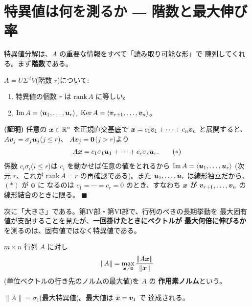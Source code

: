 \section{特異値は何を測るか ― 階数と最大伸び率}

特異値分解は、$A$ の重要な情報をすべて「読み取り可能な形」で
陳列してくれる。まず\textbf{階数}である。

\begin{teiri}[特異値分解から読み取れる部分空間]\label{thm:svd-rank}
$A = U\Sigma\,{}^tV$(階数 $r$)について:
\begin{enumerate}
\item 特異値の個数 $r$ は $\mathrm{rank}\,A$ に等しい。
\item $\mathrm{Im}\,A = \langle \bm{u}_1, \dots, \bm{u}_r \rangle$,
\quad $\mathrm{Ker}\,A = \langle \bm{v}_{r+1}, \dots, \bm{v}_n \rangle$。
\end{enumerate}
\end{teiri}

\noindent\textbf{(証明)}\quad
任意の $\bm{x} \in \mathbb{R}^n$ を正規直交基底で
$\bm{x} = c_1\bm{v}_1 + \cdots + c_n\bm{v}_n$ と展開すると、
$A\bm{v}_j = \sigma_j\bm{u}_j$($j \le r$)、
$A\bm{v}_j = \bm{0}$($j > r$)より
\[
A\bm{x} = c_1\sigma_1\bm{u}_1 + \cdots + c_r\sigma_r\bm{u}_r.
\tag{$*$}
\]
係数 $c_i\sigma_i$($i \le r$)は $c_i$ を動かせば任意の値をとれるから
$\mathrm{Im}\,A = \langle \bm{u}_1, \dots, \bm{u}_r \rangle$
(次元 $r$、これが $\mathrm{rank}\,A = r$ の再確認である)。また
$\bm{u}_1, \dots, \bm{u}_r$ は線形独立だから、$(*)$ が $\bm{0}$ に
なるのは $c_1 = \cdots = c_r = 0$ のとき、すなわち $\bm{x}$ が
$\bm{v}_{r+1}, \dots, \bm{v}_n$ の線形結合のときに限る。 $\blacksquare$

次に「大きさ」である。第IV部・第VI部で、行列のべきの長期挙動を
最大固有値が支配することを見たが、\textbf{一回掛けたときにベクトルが
最大何倍に伸びるか}を測るのは、固有値ではなく特異値である。

\begin{teigi}[作用素ノルム]\label{def:svd-norm}
$m \times n$ 行列 $A$ に対し
\[
\|A\| = \max_{\bm{x} \neq \bm{0}} \frac{\|A\bm{x}\|}{\|\bm{x}\|}
\]
(単位ベクトルの行き先のノルムの最大値)を $A$ の
\textbf{作用素ノルム}という。
\end{teigi}

\begin{teiri}\label{thm:svd-norm}
$\|A\| = \sigma_1$(最大特異値)。最大値は $\bm{x} = \bm{v}_1$ で
達成される。
\end{teiri}

